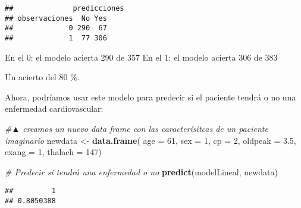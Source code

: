 \documentclass[
]{article}
\newenvironment{Shaded}{\begin{snugshade}}{\end{snugshade}}
\newcommand{\CommentTok}[1]{\textcolor[rgb]{0.56,0.35,0.01}{\textit{#1}}}
\newcommand{\DataTypeTok}[1]{\textcolor[rgb]{0.13,0.29,0.53}{#1}}
\newcommand{\DecValTok}[1]{\textcolor[rgb]{0.00,0.00,0.81}{#1}}
\newcommand{\FloatTok}[1]{\textcolor[rgb]{0.00,0.00,0.81}{#1}}
\newcommand{\KeywordTok}[1]{\textcolor[rgb]{0.13,0.29,0.53}{\textbf{#1}}}
\newcommand{\NormalTok}[1]{#1}
\newcommand{\OperatorTok}[1]{\textcolor[rgb]{0.81,0.36,0.00}{\textbf{#1}}}
\newcommand{\StringTok}[1]{\textcolor[rgb]{0.31,0.60,0.02}{#1}}
\begin{document}
\begin{Shaded}
\end{Shaded}

\begin{verbatim}
##              predicciones
## observaciones  No Yes
##             0 290  67
##             1  77 306
\end{verbatim}

En el 0: el modelo acierta 290 de 357 En el 1: el modelo acierta 306 de
383

Un acierto del 80 \%.

Ahora, podríamos usar este modelo para predecir si el paciente tendrá o
no una enfermedad cardiovascular:

\begin{Shaded}
\begin{Highlighting}[]
\CommentTok{#▲ creamos un nuevo data frame con las caracterísitcas de un paciente imaginario}
\NormalTok{newdata <-}\StringTok{ }\KeywordTok{data.frame}\NormalTok{(}
    \DataTypeTok{age =} \DecValTok{61}\NormalTok{,}
    \DataTypeTok{sex =} \DecValTok{1}\NormalTok{,}
    \DataTypeTok{cp =} \DecValTok{2}\NormalTok{,}
    \DataTypeTok{oldpeak =} \FloatTok{3.5}\NormalTok{,}
    \DataTypeTok{exang =} \DecValTok{1}\NormalTok{,}
    \DataTypeTok{thalach =} \DecValTok{147}\NormalTok{)}

\CommentTok{# Predecir si tendrá una enfermedad o no}
\KeywordTok{predict}\NormalTok{(modelLineal, newdata)}
\end{Highlighting}
\end{Shaded}

\begin{verbatim}
##         1 
## 0.8050388
\end{verbatim}
\end{document}
